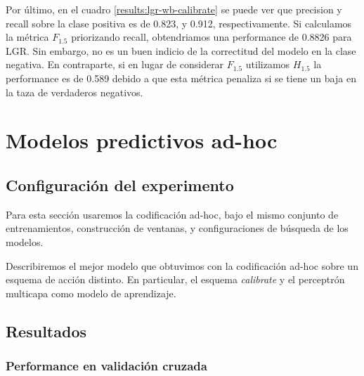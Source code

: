 Por último, en el cuadro \ref{results:lgr-wb-calibrate} se puede ver que
precision y recall sobre la clase positiva es de 0.823, y 0.912,
respectivamente. Si calculamos la métrica $F_{1.5}$ priorizando recall,
obtendriamos una performance de 0.8826 para LGR. Sin embargo, no es un buen
indicio de la correctitud del modelo en la clase negativa. En contraparte, si en
lugar de considerar $F_{1.5}$ utilizamos $H_{1.5}$ la performance es de 0.589
debido a que esta métrica penaliza si se tiene un baja en la taza de verdaderos
negativos.


\begin{table}[t!]
\centering
{}
 \caption{Métricas sobre el conjunto de test del modelo de LGR con word embeddings.}
 \label{results:lgr-wb-calibrate}
\end{table}

\section{Modelos predictivos ad-hoc}
\label{exp:wb}

\subsection{Configuración del experimento}

Para esta sección usaremos la codificación ad-hoc, bajo el mismo conjunto de
entrenamientos, construcción de ventanas, y configuraciones de búsqueda de los
modelos.

Describiremos el mejor modelo que obtuvimos con la codificación ad-hoc sobre un
esquema de acción distinto. En particular, el esquema \emph{calibrate} y el
perceptrón multicapa como modelo de aprendizaje.

\subsection{Resultados}

\subsubsection{Performance en validación cruzada}

